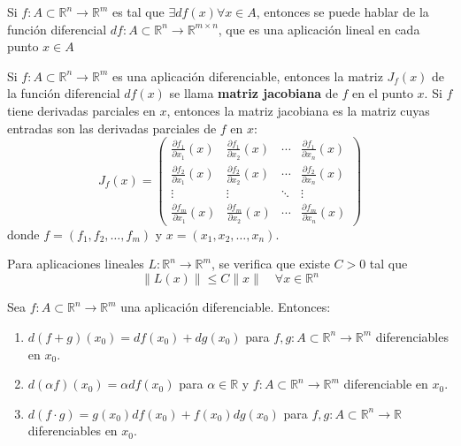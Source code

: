 \begin{observación}
    Si $f: A \subset \mathbb{R}^n \to \mathbb{R}^m$ es tal que $\exists df(x) \forall x \in A$, entonces se puede hablar de la función diferencial $df: A \subset \mathbb{R}^n \to \mathbb{R}^{m\times n}$, que es una aplicación lineal en cada punto $x \in A$ 
\end{observación}

\begin{definición}
    Si $f: A \subset \mathbb{R}^n \to \mathbb{R}^m$ es una aplicación diferenciable, entonces la matriz $J_f(x)$ de la función diferencial $df(x)$ se llama \textbf{matriz jacobiana} de $f$ en el punto $x$.
    Si $f$ tiene derivadas parciales en $x$, entonces la matriz jacobiana es la matriz cuyas entradas son las derivadas parciales de $f$ en $x$:
    $$ J_f(x) = \begin{pmatrix}
        \frac{\partial f_1}{\partial x_1}(x) & \frac{\partial f_1}{\partial x_2}(x) & \cdots & \frac{\partial f_1}{\partial x_n}(x) \\
        \frac{\partial f_2}{\partial x_1}(x) & \frac{\partial f_2}{\partial x_2}(x) & \cdots & \frac{\partial f_2}{\partial x_n}(x) \\
        \vdots & \vdots & \ddots & \vdots \\
        \frac{\partial f_m}{\partial x_1}(x) & \frac{\partial f_m}{\partial x_2}(x) & \cdots & \frac{\partial f_m}{\partial x_n}(x)
    \end{pmatrix}$$
    donde $f = (f_1, f_2, \ldots, f_m)$ y $x = (x_1, x_2, \ldots, x_n)$.
\end{definición}

\begin{observación}
    Para aplicaciones lineales $L: \mathbb{R}^n \to \mathbb{R}^m$, se verifica que existe $C > 0$ tal que
    $$ \|L(x)\| \leq C\|x\| \quad \forall x \in \mathbb{R}^n $$
\end{observación}
\begin{proposición}
    Sea $f: A \subset \mathbb{R}^n \to \mathbb{R}^m$ una aplicación diferenciable. Entonces:
    \begin{enumerate}
        \item $d(f + g)(x_0) = df(x_0) + dg(x_0)$ para $f, g: A \subset \mathbb{R}^n \to \mathbb{R}^m$ diferenciables en $x_0$.
        \item $d(\alpha f)(x_0) = \alpha df(x_0)$ para $\alpha \in \mathbb{R}$ y $f: A \subset \mathbb{R}^n \to \mathbb{R}^m$ diferenciable en $x_0$.
        \item $d(f \cdot g) = g(x_0) df(x_0) + f(x_0) dg(x_0)$ para $f, g: A \subset \mathbb{R}^n \to \mathbb{R}$ diferenciables en $x_0$.
    \end{enumerate}
\end{proposición}

